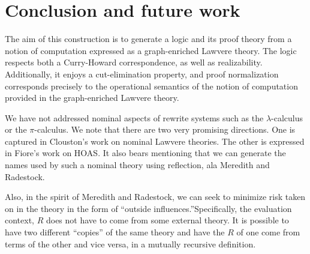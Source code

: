 \documentclass{llncs}
\renewcommand{\:}{\colon}
\newcommand{\pic}{$\pi$-calculus}
\begin{document}
\section{Conclusion and future work}

The aim of this construction is to generate a logic and its proof
theory from a notion of computation expressed as a graph-enriched
Lawvere theory. The logic respects both a Curry-Howard correspondence,
as well as realizability. Additionally, it enjoys a cut-elimination
property, and proof normalization corresponds precisely to the
operational semantics of the notion of computation provided in the
graph-enriched Lawvere theory.

We have not addressed nominal aspects of rewrite systems such as the
$\lambda$-calculus or the {\pic}. We note that there are two very
promising directions. One is captured in Clouston's work on nominal
Lawvere theories. \cite{DBLP:journals/jcss/Clouston14} The other is
expressed in Fiore's work on HOAS. \cite{DBLP:conf/csl/FioreH10} It
also bears mentioning that we can generate the names used by such a
nominal theory using reflection, ala Meredith and
Radestock. \cite{DBLP:conf/tgc/MeredithR05}

Also, in the spirit of Meredith and Radestock, we can seek to minimize
risk taken on in the theory in the form of “outside
influences.”Specifically, the evaluation context, $R$ does not have to
come from some external theory. It is possible to have two different
``copies'' of the same theory and have the $R$ of one come from terms
of the other and vice versa, in a mutually recursive definition.



\end{document}
